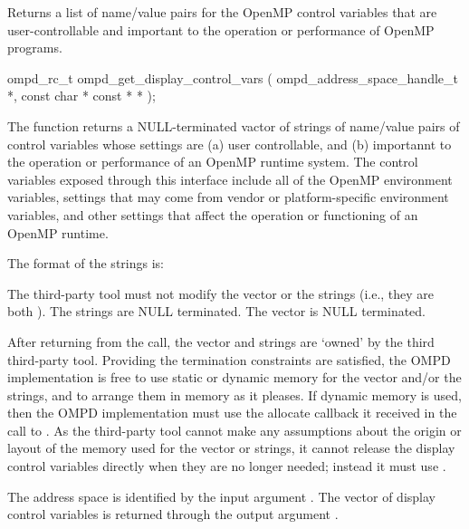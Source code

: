 
\label{ompd:ompd_get_display_control_vars}
\label{sec:ompd_get_display_control_vars}
\summary
Returns a list of name/value pairs for the OpenMP control variables
that are user-controllable and important to the operation or
performance of OpenMP programs.
\format
\begin{cspecific}
\begin{ompSyntax}
ompd_rc_t ompd_get_display_control_vars (
  ompd_address_space_handle_t *,
  const char * const * *
);
\end{ompSyntax}
\end{cspecific}

\descr
The function  returns a
NULL-terminated vactor of strings of name/value pairs of control
variables whose settings are (a) user controllable,
and (b) importannt to the operation or performance of an OpenMP
runtime system.
The control variables exposed through this interface include all
of the OpenMP environment variables, settings that may come from
vendor or platform-specific environment variables, and other
settings that affect the operation or functioning of an OpenMP
runtime.

The format of the strings is:
\begin{center}
\end{center}

The third-party tool must not modify the vector or the strings
(i.e., they are both ).
The strings are NULL terminated.
The vector is NULL terminated.

After returning from the call, the vector and strings are `owned'
by the third third-party tool.
Providing the termination constraints are satisfied, the OMPD
implementation is free to use static or dynamic memory for the
vector and/or the strings, and to arrange them in memory
as it pleases.
If dynamic memory is used, then the OMPD implementation must use
the allocate callback it received in the call to .
As the third-party tool cannot make any assumptions about the origin or
layout of the memory used for the vector or strings, it cannot release
the display control variables directly when they are no longer
needed; instead it must use .

\argdesc
The address space is identified by the input argument .
The vector of display control variables is returned through
the output argument .

